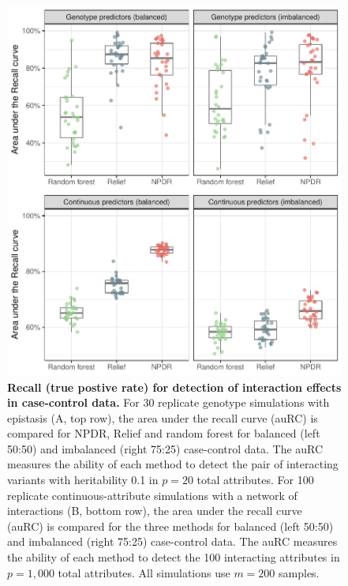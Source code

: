 \documentclass{bioinfo}
\begin{document}
\begin{figure}[!tbp]
\centerline{\includegraphics[scale = 0.55, clip]{../../figs/auRC.pdf}}
\caption{{\bf Recall (true postive rate) for detection of interaction effects in case-control data.} For 30 replicate genotype simulations with epistasis (A, top row), the area under the recall curve (auRC) is compared for NPDR, Relief and random forest for balanced (left 50:50) and  imbalanced (right 75:25) case-control data. The auRC measures the ability of each method to detect the pair of interacting variants with heritability 0.1 in $p=20$ total attributes. For 100 replicate continuous-attribute simulations with a network of interactions (B, bottom row), the area under the recall curve (auRC) is compared for the three methods for balanced (left 50:50) and  imbalanced (right 75:25) case-control data. The auRC measures the ability of each method to detect the 100 interacting attributes in $p=1,000$ total attributes. All simulations use $m = 200$ samples.}
\label{fig:rc_curve}
\end{figure}
\end{document}
